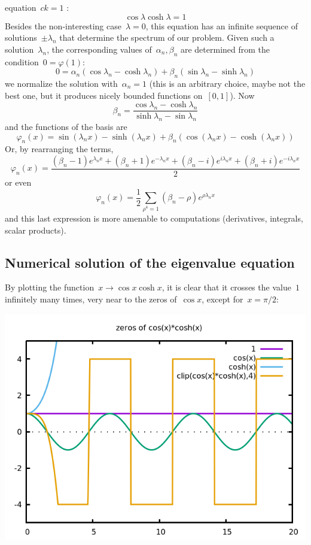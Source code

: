 equation~$ck=1$ :
$$
\cos\lambda\cosh\lambda=1
$$
Besides the non-interesting case~$\lambda=0$, this equation has an infinite
sequence of solutions~$\pm\lambda_n$ that determine the spectrum of our
problem.  Given such a solution~$\lambda_n$, the corresponding values
of~$\alpha_n,\beta_n$ are determined from the condition~$0=\varphi(1)$:
$$
0 =
\alpha_n(\cos\lambda_n-\cosh\lambda_n)
+\beta_n(\sin\lambda_n-\sinh\lambda_n)
$$
we normalize the solution with~$\alpha_n=1$ (this is an arbitrary choice,
maybe not the best one, but it produces nicely bounded functions on~$[0,1]$).  Now
$$
\beta_n=\frac{\cos\lambda_n-\cosh\lambda_n}{\sinh\lambda_n-\sin\lambda_n}
$$
and the functions of the basis are
$$
\varphi_n(x)=\sin(\lambda_nx)-\sinh(\lambda_nx)+\beta_n(\cos(\lambda_nx)-\cosh(\lambda_nx))
$$
Or, by rearranging the terms,
$$
\varphi_n(x)=
\frac{
 (\beta_n-1) e^{\lambda_nx}
+(\beta_n+1) e^{-\lambda_nx}
+(\beta_n-i) e^{i\lambda_nx}
+(\beta_n+i) e^{-i\lambda_nx}
}{2}
$$
or even
$$
\varphi_n(x)=\frac{1}{2}\sum_{\rho^4=1}
(\beta_n-\rho)e^{\rho\lambda_n x}
$$
and this last expression is more amenable to computations (derivatives,
integrals, scalar products).

\subsection{Numerical solution of the eigenvalue equation}

By plotting the function~$x\to\cos x\cosh x$, it is clear that it crosses the
value~$1$ infinitely many times, very near to the zeros of~$\cos x$, except
for~$x=\pi/2$:

\includegraphics{coscosh.png}


